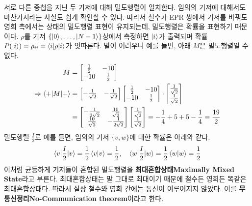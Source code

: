 \documentclass[a4paper,chapter,atbegshi]{oblivoir}
\begin{document}
서로 다른 중첩을 지닌 두 기저에 대해 밀도행렬이 일치한다. 임의의
기저에 대해서도 마찬가지라는 사실도 쉽게 확인할 수 있다. 따라서 철수가
EPR 쌍에서 기저를 바꿔도 영희 측에서는 상태의 밀도행렬 표현이 유지되는데,
밀도행렬은 확률을 표현하기 때문이다. $\rho$를 기저 
$\{\ket0,\ldots,\ket{N-1}\}$상에서 측정하면 $\ket{i}$가
출력되며 확률 $P(\ket{i})=\rho_{ii}=\braket{i|\rho|i}$가 잇따른다. 말이 어려우니
예를 들면, 아래 $M$은 밀도행렬일 수 없다.
\begin{align*}
  M &= \begin{bmatrix}\frac{1}{2} &-10 \\ -10 &\frac{1}{2}\end{bmatrix}\\
  \Rightarrow\braket{+|M|+}&=
  \begin{bmatrix}-\frac{1}{\sqrt2}&-\frac{1}{\sqrt2}\end{bmatrix}
\begin{bmatrix}\frac{1}{2} &-10 \\ -10 &\frac{1}{2}\end{bmatrix}\cdot
\begin{bmatrix}\frac{1}{\sqrt2}\\\frac{1}{\sqrt2}\end{bmatrix}\\&=
  \begin{bmatrix}-\frac{1}{2\sqrt2}&\frac{10}{\sqrt2}\\
  \frac{10}{\sqrt2}&-\frac{1}{2\sqrt2}\end{bmatrix}
   \begin{bmatrix}\frac{1}{\sqrt2}\\\frac{1}{\sqrt2}\end{bmatrix}
   =-\frac{1}{4}+5+5-\frac{1}{4}=\frac{19}{2}
\end{align*}
밀도행렬 $\frac{I}{2}$로 예를 들면, 임의의 기저 
$\{v,w\}$에 대한 확률은 아래와 같다.
\[
  \braket{v|\frac{I}{2}|v}=\frac{1}{2}\braket{v|v}=\frac{1}{2},\quad
  \braket{w|\frac{I}{2}|w}=\frac{1}{2}\braket{w|w}=\frac{1}{2}
\]
이처럼 균등하게 기저들이 혼합된 밀도행렬을 \textbf{최대혼합상태\tiny Maximally Mixed
State}라고 부른다. 최대혼합상태는 말 그대로 최대이기 때문에 철수든 영희든
똑같은 최대혼합상태다. 따라서 실상 철수와 영희 간에는 통신이 이루어지지 않았다.
이를 \textbf{무통신정리\tiny No-Communication theorem}이라고 한다.
\end{document}
